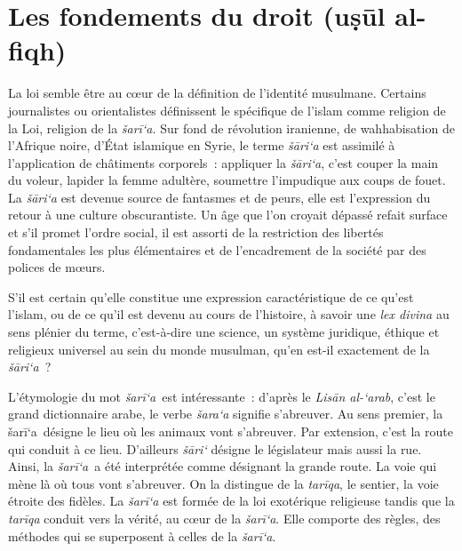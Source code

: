 

\chapter{Les fondements du droit (uṣūl al-fiqh)}


La loi semble être au cœur de la définition de l'identité musulmane.
Certains journalistes ou orientalistes définissent le spécifique de
l'islam comme religion de la Loi, religion de la \emph{šarī`a.} Sur fond
de révolution iranienne, de wahhabisation de l'Afrique noire, d'État
islamique en Syrie, le terme \emph{šāri`a} est assimilé à l'application
de châtiments corporels~: appliquer la \emph{šāri`a}, c'est couper la
main du voleur, lapider la femme adultère, soumettre l'impudique aux
coups de fouet. La \emph{šāri`a} est devenue source de fantasmes et de
peurs, elle est l'expression du retour à une culture obscurantiste. Un
âge que l'on croyait dépassé refait surface et s'il promet l'ordre
social, il est assorti de la restriction des libertés fondamentales les
plus élémentaires et de l'encadrement de la société par des polices de
mœurs.

S'il est certain qu'elle constitue une expression caractéristique de ce
qu'est l'islam, ou de ce qu'il est devenu au cours de l'histoire, à
savoir une \emph{lex divina} au sens plénier du terme, c'est-à-dire une
science, un système juridique, éthique et religieux universel au sein du
monde musulman, qu'en est-il exactement de la \emph{šāri`a~}?

L'étymologie du mot \emph{šarī`a}~est intéressante~: d'après le
\emph{Lisān al-`arab}, c'est le grand dictionnaire arabe, le verbe
\emph{šara`a} signifie s'abreuver. Au sens premier, la šarī`a~désigne le
lieu où les animaux vont s'abreuver. Par extension, c'est la route qui
conduit à ce lieu. D'ailleurs \emph{šāri`} désigne le législateur mais
aussi la rue. Ainsi, la \emph{šarī`a}~a été interprétée comme désignant
la grande route. La voie qui mène là où tous vont s'abreuver. On la
distingue de la \emph{tarīqa}, le sentier, la voie étroite des fidèles.
La \emph{šarī`a} est formée de la loi exotérique religieuse tandis que
la \emph{tarīqa} conduit vers la vérité, au cœur de la \emph{šarī`a}.
Elle comporte des règles, des méthodes qui se superposent à celles de la
\emph{šarī`a}. ~

